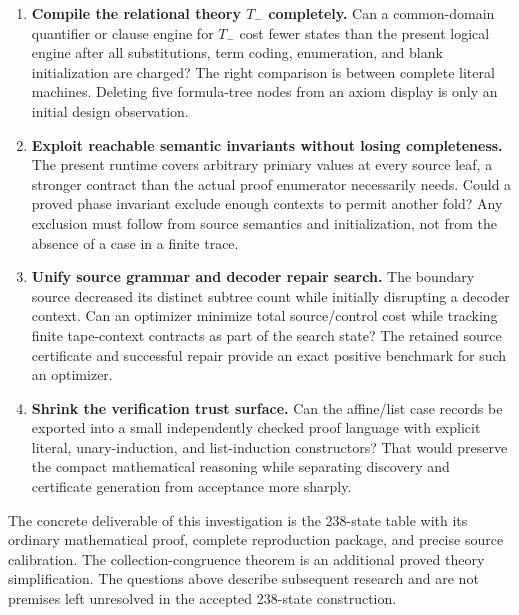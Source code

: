 \begin{enumerate}[label=\textbf{Q\arabic*.},leftmargin=2.8em]
\item \textbf{Compile the relational theory $T_-$ completely.}
Can a common-domain quantifier or clause engine for
$T_-$ cost fewer states than the present logical
engine after all substitutions, term coding,
enumeration, and blank initialization are charged?
The right comparison is between complete literal
machines. Deleting five formula-tree nodes from an
axiom display is only an initial design observation.

\item \textbf{Exploit reachable semantic invariants without losing completeness.}
The present runtime covers arbitrary primary values
at every source leaf, a stronger contract than the
actual proof enumerator necessarily needs. Could a
proved phase invariant exclude enough contexts to
permit another fold? Any exclusion must follow
from source semantics and initialization, not from
the absence of a case in a finite trace.

\item \textbf{Unify source grammar and decoder repair search.}
The boundary source decreased its distinct subtree
count while initially disrupting a decoder context.
Can an optimizer minimize total source/control cost
while tracking finite tape-context contracts as part
of the search state? The retained source certificate
and successful repair provide an exact positive
benchmark for such an optimizer.

\item \textbf{Shrink the verification trust surface.}
Can the affine/list case records be exported into a
small independently checked proof language with
explicit literal, unary-induction, and list-induction
constructors? That would preserve the compact
mathematical reasoning while separating discovery
and certificate generation from acceptance more
sharply.
\end{enumerate}

The concrete deliverable of this investigation is the
238-state table with its ordinary mathematical proof,
complete reproduction package, and precise source
calibration. The collection-congruence theorem is an
additional proved theory simplification. The questions
above describe subsequent research and are not premises
left unresolved in the accepted 238-state construction.

